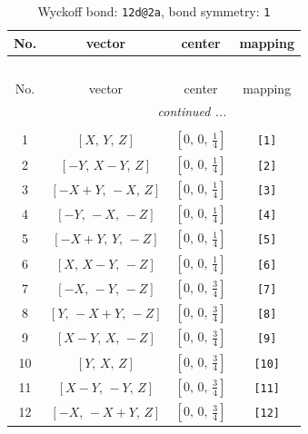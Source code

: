 \documentclass[fleqn,8pt]{jsarticle}
\begin{document}
\begin{longtable}{cccc}
\caption{Wyckoff bond: {\tt 12d@2a}, bond symmetry: {\tt 1}}
 \\
 \hline \hline
No. & vector & center & mapping \\ \hline \endfirsthead

\multicolumn{3}{l}{\tablename\ \thetable{}} \\
 \hline \hline
No. & vector & center & mapping \\ \hline \endhead

 \hline \hline
\multicolumn{3}{r}{\footnotesize\it continued ...} \\ \endfoot

 \hline \hline
\multicolumn{3}{r}{} \\ \endlastfoot

1 & $\left[ X,\, Y,\, Z \right]$ & $\left[ 0,\, 0,\, \frac{1}{4} \right]$ & {\tt [1]} \\ \hline
2 & $\left[ - Y,\, X - Y,\, Z \right]$ & $\left[ 0,\, 0,\, \frac{1}{4} \right]$ & {\tt [2]} \\ \hline
3 & $\left[ - X + Y,\, - X,\, Z \right]$ & $\left[ 0,\, 0,\, \frac{1}{4} \right]$ & {\tt [3]} \\ \hline
4 & $\left[ - Y,\, - X,\, - Z \right]$ & $\left[ 0,\, 0,\, \frac{1}{4} \right]$ & {\tt [4]} \\ \hline
5 & $\left[ - X + Y,\, Y,\, - Z \right]$ & $\left[ 0,\, 0,\, \frac{1}{4} \right]$ & {\tt [5]} \\ \hline
6 & $\left[ X,\, X - Y,\, - Z \right]$ & $\left[ 0,\, 0,\, \frac{1}{4} \right]$ & {\tt [6]} \\ \hline
7 & $\left[ - X,\, - Y,\, - Z \right]$ & $\left[ 0,\, 0,\, \frac{3}{4} \right]$ & {\tt [7]} \\ \hline
8 & $\left[ Y,\, - X + Y,\, - Z \right]$ & $\left[ 0,\, 0,\, \frac{3}{4} \right]$ & {\tt [8]} \\ \hline
9 & $\left[ X - Y,\, X,\, - Z \right]$ & $\left[ 0,\, 0,\, \frac{3}{4} \right]$ & {\tt [9]} \\ \hline
10 & $\left[ Y,\, X,\, Z \right]$ & $\left[ 0,\, 0,\, \frac{3}{4} \right]$ & {\tt [10]} \\ \hline
11 & $\left[ X - Y,\, - Y,\, Z \right]$ & $\left[ 0,\, 0,\, \frac{3}{4} \right]$ & {\tt [11]} \\ \hline
12 & $\left[ - X,\, - X + Y,\, Z \right]$ & $\left[ 0,\, 0,\, \frac{3}{4} \right]$ & {\tt [12]} \\
\end{longtable}
\end{document}
